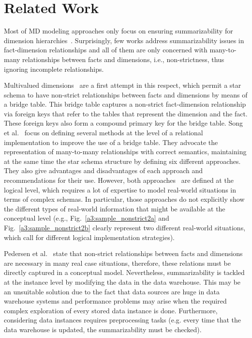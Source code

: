 \section{Related Work}\label{a3:sec:related}
Most of MD modeling approaches only focus on ensuring
summarizability for dimension
hierarchies~\cite{DBLP:journals/tods/HurtadoGM05,DBLP:journals/dke/MalinowskiZ06,DBLP:conf/dawak/MansmannS06,DBLP:conf/er/AkokaCP01}.
Surprisingly, few works address summarizability issues in
fact-dimension relationships and all of them are only concerned with
many-to-many relationships between facts and dimensions, i.e.,
non-strictness, thus ignoring incomplete relationships.

Multivalued dimensions~\cite{book/Kimball/DW} are a first attempt in
this respect, which permit a star schema to have non-strict
relationships between facts and dimensions by means of a bridge
table. This bridge table captures a non-strict fact-dimension
relationship via foreign keys that refer to the tables that
represent the dimension and the fact. These foreign keys also form a
compound primary key for the bridge table. Song et
al.~\cite{DBLP:conf/dmdw/SongRME01} focus on defining several
methods at the level of a relational implementation to improve the
use of a bridge table. They advocate the representation of
many-to-many relationships with correct semantics, maintaining at
the same time the star schema structure by defining six different
approaches. They also give advantages and disadvantages of each
approach and recommendations for their use. However, both
approaches~\cite{book/Kimball/DW,DBLP:conf/dmdw/SongRME01} are
defined at the logical level, which requires a lot of expertise to
model real-world situations in terms of complex schemas. In
particular, those approaches do not explicitly show the different
types of real-world information that might be available at the
conceptual level (e.g., Fig.~\ref{a3:sample_nonstrict2a} and
Fig.~\ref{a3:sample_nonstrict2b} clearly represent two different
real-world situations, which call for different logical
implementation strategies).

Pedersen et al.~\cite{DBLP:journals/is/PedersenJD01} state that
non-strict relationships between facts and dimensions are necessary
in many real case situations, therefore, these relations must be
directly captured in a conceptual model. Nevertheless,
summarizability is tackled at the instance level by modifying the
data in the data warehouse. This may be an unsuitable solution due
to the fact that data sources are huge in data warehouse systems and
performance problems may arise when the required complex exploration
of every stored data instance is done. Furthermore, considering data
instances requires preprocessing tasks (e.g. every time that the
data warehouse is updated, the summarizability must be checked).

